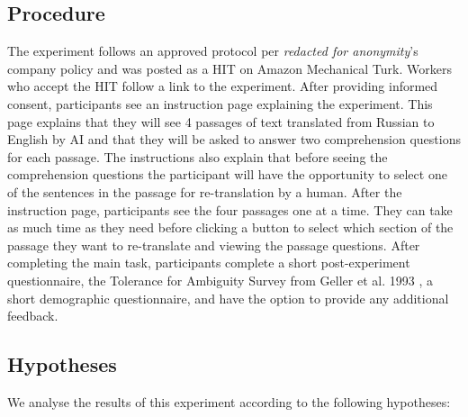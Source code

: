 \subsection{Procedure}

The experiment follows an approved protocol per \textit{redacted for anonymity}’s company policy and was posted as a HIT on Amazon Mechanical Turk. Workers who accept the HIT follow a link to the experiment. After providing informed consent, participants see an instruction page explaining the experiment. This page explains that they will see 4 passages of text translated from Russian to English by AI and that they will be asked to answer two comprehension questions for each passage. The instructions also explain that before seeing the comprehension questions the participant will have the opportunity to select one of the sentences in the passage for re-translation by a human. After the instruction page, participants see the four passages one at a time. They can take as much time as they need before clicking a button to select which section of the passage they want to re-translate and viewing the passage questions. After completing the main task, participants complete a short post-experiment questionnaire, the Tolerance for Ambiguity Survey from Geller et al. 1993 \cite{gellerTolerance1993}, a short demographic questionnaire, and have the option to provide any additional feedback.

\subsection{Hypotheses}



We analyse the results of this experiment according to the following hypotheses: 


